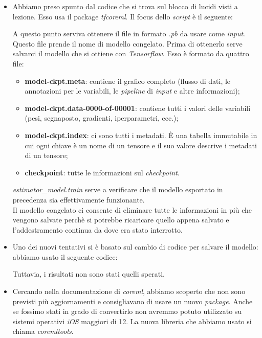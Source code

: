 \begin{itemize}
	\item Abbiamo preso spunto dal codice che si trova sul blocco di lucidi visti a lezione. Esso usa il package \textit{tfcoreml}. Il focus dello \textit{script} è il seguente:
	
	
	A questo punto serviva ottenere il file in formato \textit{.pb} da usare come \textit{input}. Questo file prende il nome di modello congelato. Prima di ottenerlo serve salvarci il modello che si ottiene con \textit{Tensorflow}. Esso è formato da quattro file:
	\begin{itemize}
		\item \textbf{model-ckpt.meta}: contiene il grafico completo (flusso di dati, le annotazioni per le variabili, le \textit{pipeline} di \textit{input} e altre informazioni);
     	\item \textbf{model-ckpt.data-0000-of-00001}: contiene tutti i valori delle variabili (pesi, segnaposto, gradienti, iperparametri, ecc.);
     	\item \textbf{model-ckpt.index}: ci sono tutti i metadati. È una tabella immutabile in cui ogni chiave è un nome di un tensore e il suo valore descrive i metadati di un tensore;
     	\item \textbf{checkpoint}: tutte le informazioni sul \textit{checkpoint}.
	\end{itemize}
      
	
	\textit{estimator\_model.train} serve a verificare che il modello esportato in precedenza sia effettivamente funzionante.\\
	\newline
	Il modello congelato ci consente di eliminare tutte le informazioni in più che vengono salvate perchè si potrebbe ricaricare quello appena salvato e l'addestramento continua da dove era stato interrotto.
	
	
	\item Uno dei nuovi tentativi si è basato sul cambio di codice per salvare il modello: abbiamo usato il seguente codice:
	
	
	Tuttavia, i risultati non sono stati quelli sperati.
	
	\item Cercando nella documentazione di \textit{coreml}, abbiamo scoperto che non sono previsti più aggiornamenti e consigliavano di usare un nuovo \textit{package}. Anche se fossimo stati in grado di convertirlo non avremmo potuto utilizzato su sistemi operativi \textit{iOS} maggiori di 12. La nuova libreria che abbiamo usato si chiama \textit{coremltools}.
	

\end{itemize}
